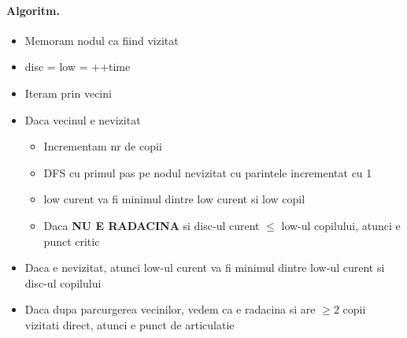 \documentclass{article}
\begin{document}
\paragraph*{Algoritm.}
\begin{itemize}
    \item Memoram nodul ca fiind vizitat
    \item disc = low = ++time
    \item Iteram prin vecini
    \item Daca vecinul e nevizitat
          \begin{itemize}
              \item Incrementam nr de copii
              \item DFS cu primul pas pe nodul nevizitat cu parintele incrementat cu 1
              \item low curent va fi minimul dintre low curent si low copil
              \item Daca \textbf{NU E RADACINA} si disc-ul curent $\leq$ low-ul copilului, atunci e punct critic
          \end{itemize}
    \item Daca e nevizitat, atunci low-ul curent va fi minimul dintre low-ul curent si disc-ul copilului
    \item Daca dupa parcurgerea vecinilor, vedem ca e radacina si are $\geq 2$ copii vizitati direct, atunci e punct de articulatie
\end{itemize}
\end{document}
